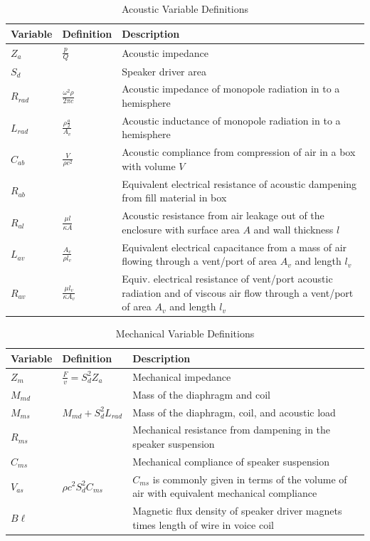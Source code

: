 \documentclass[10pt,letterpaper]{article}
\begin{document}
\begin{table}
\centering
\renewcommand{\arraystretch}{1.5}
\begin{tabularx}{\textwidth}{@{} ll X @{}}
\toprule
Variable & Definition & Description \\
\midrule
$Z_a$ & $\frac{p}{Q}$ & Acoustic impedance\\
$S_d$ & & Speaker driver area\\
$R_{rad}$ & $\frac{\omega^2 \rho}{2\pi c}$ & Acoustic impedance of monopole radiation in to a hemisphere\\
$L_{rad}$ & $\frac{\rho \frac{a}{2}}{A_v}$ & Acoustic inductance of monopole radiation in to a hemisphere\\
$C_{ab}$ & $\frac{V}{\rho c^2}$ & Acoustic compliance from compression of air in a box with volume $V$\\
$R_{ab}$ & & Equivalent electrical resistance of acoustic dampening from fill material in box\\
$R_{al}$ & $\frac{\mu l}{\kappa A}$ & Acoustic resistance from air leakage out of the enclosure with surface area $A$ and wall thickness $l$\\
$L_{av}$ & $\frac{A_v}{\rho l_v}$ & Equivalent electrical capacitance from a mass of air flowing through a vent/port of area $A_v$ and length $l_v$\\
$R_{av}$ & $\frac{\mu l_v}{\kappa A_v}$ & Equiv. electrical resistance of vent/port acoustic radiation and of viscous air flow through a vent/port of area $A_v$ and length $l_v$\\
\bottomrule
\end{tabularx}
\caption{Acoustic Variable Definitions}\label{table:acoustic-variables}
\end{table}

\begin{table}
\centering
\renewcommand{\arraystretch}{1.5}
\begin{tabularx}{\textwidth}{@{} ll X @{}}
\toprule
Variable & Definition & Description \\
\midrule
$Z_m$ & $\frac{F}{v}=S_d^2 Z_a$ & Mechanical impedance\\
$M_{md}$ & & Mass of the diaphragm and coil\\
$M_{ms}$ &$M_{md}+S_d^2L_{rad}$ & Mass of the diaphragm, coil, and acoustic load\\
$R_{ms}$ & & Mechanical resistance from dampening in the speaker suspension\\
$C_{ms}$ &  & Mechanical compliance of speaker suspension\\
$V_{as}$ & $\rho c^2 S_d^2 C_{ms}$  & $C_{ms}$ is commonly given in terms of the volume of air with equivalent mechanical compliance\\
$B\ell$ & & Magnetic flux density of speaker driver magnets times length of wire in voice coil\\
\bottomrule
\end{tabularx}
\caption{Mechanical Variable Definitions}\label{table:mech-variables}
\end{table}
\end{document}
